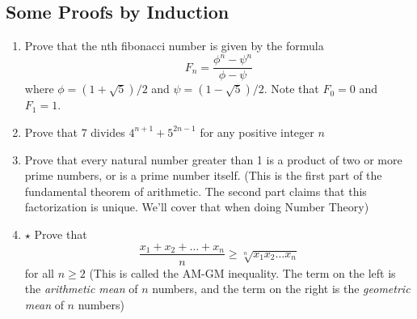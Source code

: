 \documentclass[12pt]{article}
\begin{document}
\subsection*{Some Proofs by Induction}

\begin{enumerate}[label=Q\arabic*.,resume]
    \item Prove that the nth fibonacci number is given by the formula $$F_n = \frac{\phi^n - \psi^n}{\phi - \psi}$$
        where $\phi = (1+\sqrt{5})/2$ and $\psi = (1-\sqrt{5})/2$. Note that 
        $F_0 = 0$ and $F_1 = 1$.

    \item Prove that 7 divides $4^{n+1} + 5^{2n-1}$ for any positive integer $n$

    \item Prove that every natural number greater than 1 is a product of two 
        or more prime numbers, or is a prime number itself.
        (This is the first part of the fundamental theorem of arithmetic. The 
        second part claims that this factorization is unique. We'll cover that 
        when doing Number Theory)
    
    \item $\star$ Prove that $$\frac{x_1 + x_2 + \ldots + x_n}{n} \ge \sqrt[n]{x_1x_2
        \ldots x_n}$$ for all $n \ge 2$ (This is called the AM-GM inequality. The 
        term on the left is the \emph{arithmetic mean} of $n$ numbers, and 
        the term on the right is the \emph{geometric mean} of $n$ numbers)

\end{enumerate}
\end{document}
